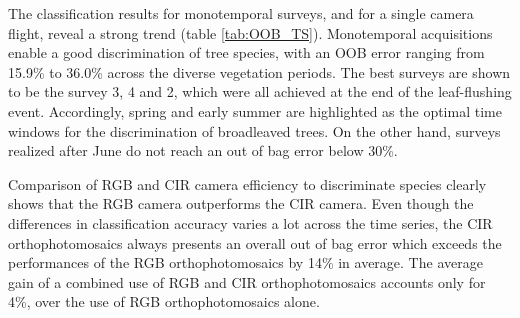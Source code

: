 \documentclass[remotesensing,article,submit,moreauthors,pdftex,12pt,a4paper]{mdpi} %
\begin{document}
The classification results for monotemporal surveys, and for a single camera flight, reveal a strong trend (table \ref{tab:OOB_TS}). 
Monotemporal acquisitions enable a good discrimination of tree species, with an OOB error ranging from 15.9\% to 36.0\% across the diverse vegetation periods. 
The best surveys are shown to be the survey 3, 4 and 2, which were all achieved at the end of the leaf-flushing event. 
Accordingly, spring and early summer are highlighted as the optimal time windows for the discrimination of broadleaved trees. 
On the other hand, surveys realized after June do not reach an out of bag error below 30\%. 

Comparison of RGB and CIR camera efficiency to discriminate species clearly shows that the RGB camera outperforms the CIR camera. 
Even though the differences in classification accuracy varies a lot across the time series, the CIR orthophotomosaics always presents an overall out of bag error which exceeds the performances of the RGB orthophotomosaics by 14\% in average.
The average gain of a combined use of RGB and CIR orthophotomosaics accounts only for 4\%, over the use of RGB orthophotomosaics alone.
\end{document}
